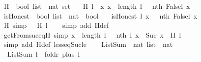 \begin{isabellebody}
\isanewline
{}\isamarkupfalse%
\ H\ {\isacharcolon}{\isacharcolon}\ {\isachardoublequoteopen}bool\ list\ {\isasymRightarrow}\ nat\ set{\isachardoublequoteclose}\ \isanewline
\ \ {\isachardoublequoteopen}H\ l\ {\isacharequal}\ {\isacharbraceleft}x{\isachardot}\ x\ {\isasymle}\ length\ l\ {\isasymand}\ {\isasymnot}\ {\isacharparenleft}nth\ {\isacharparenleft}False{\isacharhash}l{\isacharparenright}\ x{\isacharparenright}{\isacharbraceright}{\isachardoublequoteclose}\isanewline
\isanewline
{}\isamarkupfalse%
\ isHonest\ {\isacharcolon}{\isacharcolon}\ {\isachardoublequoteopen}bool\ list\ {\isasymRightarrow}\ nat\ {\isasymRightarrow}\ bool{\isachardoublequoteclose}\ \isanewline
\ \ {\isachardoublequoteopen}isHonest\ l\ x\ {\isacharequal}\ {\isacharparenleft}{\isasymnot}\ {\isacharparenleft}nth\ {\isacharparenleft}False{\isacharhash}l{\isacharparenright}\ x{\isacharparenright}{\isacharparenright}{\isachardoublequoteclose}\isanewline
\ \ \isanewline
{}\isamarkupfalse%
\ H{\isacharunderscore}{}\ {\isacharbrackleft}simp{\isacharbrackright}{\isacharcolon}\ {\isachardoublequoteopen}{}\ {\isasymin}\ H\ l{\isachardoublequoteclose}\isanewline
%
\isadelimproof
\ \ %
\endisadelimproof
%
\isatagproof
{}\isamarkupfalse%
\ {\isacharparenleft}simp\ add{\isacharcolon}\ H{\isacharunderscore}def{\isacharparenright}%
\endisatagproof
{\isafoldproof}%
%
\isadelimproof
\isanewline
%
\endisadelimproof
\ \ \isanewline
{}\isamarkupfalse%
\ getFrom{\isacharunderscore}suc{\isacharunderscore}eq{\isacharunderscore}H\ {\isacharbrackleft}simp{\isacharbrackright}{\isacharcolon}\ {\isachardoublequoteopen}x\ {\isacharless}\ length\ l\ {\isasymand}\ {\isasymnot}\ nth\ l\ x\ {\isasymlongleftrightarrow}\ Suc\ x\ {\isasymin}\ H\ l{\isachardoublequoteclose}\isanewline
%
\isadelimproof
\ \ %
\endisadelimproof
%
\isatagproof
{}\isamarkupfalse%
\ {\isacharparenleft}simp\ add{\isacharcolon}\ H{\isacharunderscore}def\ less{\isacharunderscore}eq{\isacharunderscore}Suc{\isacharunderscore}le{\isacharparenright}%
\endisatagproof
{\isafoldproof}%
%
\isadelimproof
\isanewline
%
\endisadelimproof
\ \ \isanewline
\isanewline
{}\isamarkupfalse%
\ ListSum\ {\isacharcolon}{\isacharcolon}\ {\isachardoublequoteopen}nat\ list\ {\isasymRightarrow}\ nat{\isachardoublequoteclose}\ \isanewline
\ \ {\isachardoublequoteopen}ListSum\ l\ {\isacharequal}\ foldr\ plus\ l\ {}{\isachardoublequoteclose}\isanewline
\isanewline
{}\isamarkupfalse%

\end{isabellebody}
